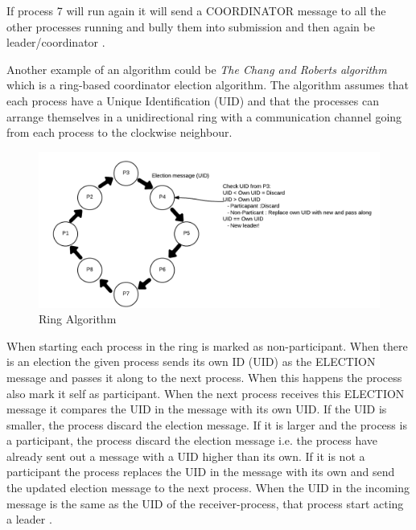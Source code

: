 \documentclass[Main]{subfiles}
\begin{document}
If process 7 will run again it will send a COORDINATOR message to all the other processes running and bully them into submission and then again be leader/coordinator \cite{ElectionAlgorithm}.

Another example of an algorithm could be \textit{The Chang and Roberts algorithm} which is a ring-based coordinator election algorithm. The algorithm assumes that each process have a Unique Identification (UID) and that the processes can arrange themselves in a unidirectional ring with a communication channel going from each process to the clockwise neighbour.

\begin{figure}[H]
\centering
\includegraphics[scale=0.30]{Figurer/ChangAndRobertsRingAlgorithm.png}
\caption{Ring Algorithm}
\end{figure}

When starting each process in the ring is marked as non-participant.
When there is an election the given process sends its own ID (UID) as the ELECTION message and passes it along to the next process. When this happens the process also mark it self as participant. 
When the next process receives this ELECTION message it compares the UID in the message with its own UID. If the UID is smaller, the process discard the election message. If it is larger and the process is a participant, the process discard the election message i.e. the process have already sent out a message with a UID higher than its own. If it is not a participant the process replaces the UID in the message with its own and send the updated election message to the next process. 
When the UID in the incoming message is the same as the UID of the receiver-process, that process start acting a leader \cite{wiki-RingAlgorithm}.
\end{document}
